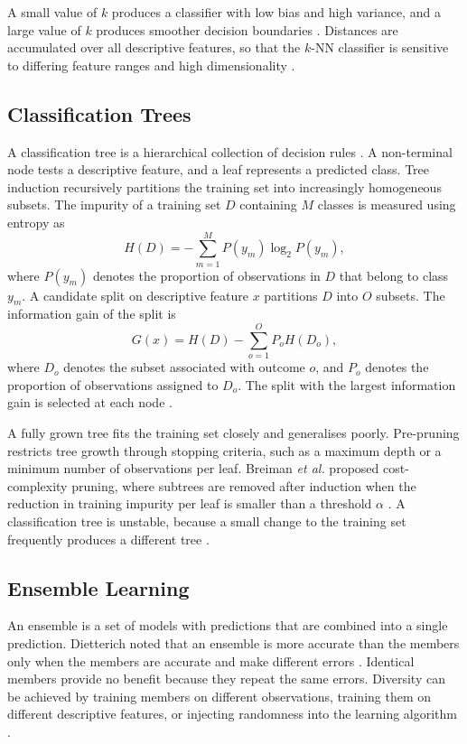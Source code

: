 \documentclass[conference]{IEEEtran}
\begin{document}
A small value of $k$ produces a classifier with low bias and high variance, and a large value of $k$ produces smoother decision boundaries \cite{kelleher}. Distances are accumulated over all descriptive features, so that the $k$-NN classifier is sensitive to differing feature ranges and high dimensionality \cite{kelleher}.

\subsection{Classification Trees}

A classification tree is a hierarchical collection of decision rules \cite{quinlan}. A non-terminal node tests a descriptive feature, and a leaf represents a predicted class. Tree induction recursively partitions the training set into increasingly homogeneous subsets. The impurity of a training set $D$ containing $M$ classes is measured using entropy as
\begin{equation}
H(D)=-\sum_{m=1}^{M}P(y_m)\log_2 P(y_m),
\label{eq:entropy}
\end{equation}
where $P(y_m)$ denotes the proportion of observations in $D$ that belong to class $y_m$. A candidate split on descriptive feature $x$ partitions $D$ into $O$ subsets. The information gain of the split is
\begin{equation}
G(x)=H(D)-\sum_{o=1}^{O}P_o H(D_o),
\label{eq:gain}
\end{equation}
where $D_o$ denotes the subset associated with outcome $o$, and $P_o$ denotes the proportion of observations assigned to $D_o$. The split with the largest information gain is selected at each node \cite{quinlan}.

A fully grown tree fits the training set closely and generalises poorly. Pre-pruning restricts tree growth through stopping criteria, such as a maximum depth or a minimum number of observations per leaf. Breiman \textit{et al.} proposed cost-complexity pruning, where subtrees are removed after induction when the reduction in training impurity per leaf is smaller than a threshold $\alpha$ \cite{cart}. A classification tree is unstable, because a small change to the training set frequently produces a different tree \cite{breiman1996}.

\subsection{Ensemble Learning}

An ensemble is a set of models with predictions that are combined into a single prediction. Dietterich noted that an ensemble is more accurate than the members only when the members are accurate and make different errors \cite{dietterich2000}. Identical members provide no benefit because they repeat the same errors. Diversity can be achieved by training members on different observations, training them on different descriptive features, or injecting randomness into the learning algorithm \cite{dietterich2000}.
\end{document}
